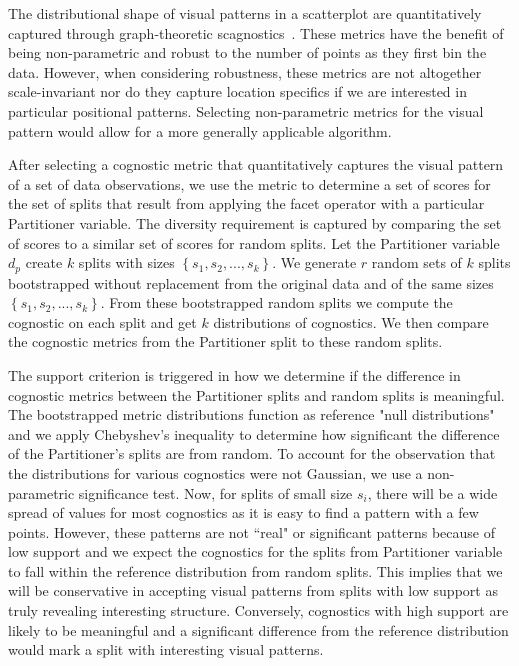 The distributional shape of visual patterns in a scatterplot are quantitatively captured through graph-theoretic scagnostics~\cite{Wilkinson2005}. These metrics have the benefit of being non-parametric and robust to the number of points as they first bin the data. However, when considering robustness, these metrics are not altogether scale-invariant nor do they capture location specifics if we are interested in particular positional patterns. Selecting non-parametric metrics for the visual pattern would allow for a more generally applicable algorithm. 

After selecting a cognostic metric that quantitatively captures the visual pattern of a set of data observations, we use the metric to determine a set of scores for the set of splits that result from applying the facet operator with a particular Partitioner variable. The diversity requirement is captured by comparing the set of scores to a similar set of scores for random splits. Let the Partitioner variable $d_p$ create $k$ splits with sizes $\left\{ {s_1, s_2,...,s_k}\right\}$. We generate $r$ random sets of $k$ splits bootstrapped without replacement from the original data and of the same sizes $\left\{ {s_1, s_2,...,s_k}\right\}$. From these bootstrapped random splits we compute the cognostic on each split and get $k$ distributions of cognostics. We then compare the cognostic metrics from the Partitioner split to these random splits.

The support criterion is triggered in how we determine if the difference in cognostic metrics between the Partitioner splits and random splits is meaningful. The bootstrapped metric distributions function as reference "null distributions" and we apply Chebyshev's inequality to determine how significant the difference of the Partitioner's splits are from random. To account for the observation that the distributions for various cognostics were not Gaussian, we use a non-parametric significance test. Now, for splits of small size $s_i$, there will be a wide spread of values for most cognostics as it is easy to find a pattern with a few points. However, these patterns are not ``real" or significant patterns because of low support and we expect the cognostics for the splits from Partitioner variable to fall within the reference distribution from random splits. This implies that we will be conservative in accepting visual patterns from splits with low support as truly revealing interesting structure. Conversely, cognostics with high support are likely to be meaningful and a significant difference from the reference distribution would mark a split with interesting visual patterns.

